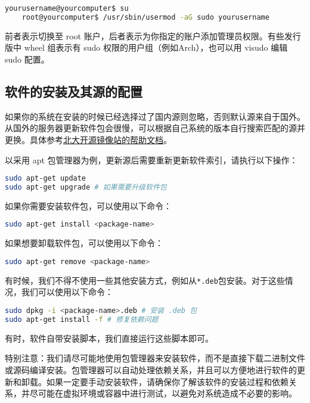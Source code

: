 \documentclass[../main.tex]{subfiles}
\begin{document}
\begin{lstlisting}[language=bash]
    yourusername@yourcomputer$ su
    root@yourcomputer$ /usr/sbin/usermod -aG sudo yourusername
\end{lstlisting}

前者表示切换至 root 账户，后者表示为你指定的账户添加管理员权限。有些发行版中 wheel 组表示有 sudo 权限的用户组（例如Arch），也可以用 visudo 编辑 sudo 配置。

\subsection{软件的安装及其源的配置}

如果你的系统在安装的时候已经选择过了国内源则忽略，否则默认源来自于国外。从国外的服务器更新软件包会很慢，可以根据自己系统的版本自行搜索匹配的源并更换。具体参考\href{https://mirrors.pku.edu.cn/Help}{北大开源镜像站的帮助文档}。

以采用 apt 包管理器为例，更新源后需要重新更新软件索引，请执行以下操作：

\begin{lstlisting}[language=bash]
sudo apt-get update
sudo apt-get upgrade # 如果需要升级软件包
\end{lstlisting}

如果你需要安装软件包，可以使用以下命令：
\begin{lstlisting}[language=bash]
sudo apt-get install <package-name>
\end{lstlisting}

如果想要卸载软件包，可以使用以下命令：
\begin{lstlisting}[language=bash]
sudo apt-get remove <package-name>
\end{lstlisting}

有时候，我们不得不使用一些其他安装方式，例如从\texttt{*.deb}包安装。对于这些情况，我们可以使用以下命令：

\begin{lstlisting}[language=bash]
sudo dpkg -i <package-name>.deb # 安装 .deb 包
sudo apt-get install -f # 修复依赖问题
\end{lstlisting}

有时，软件自带安装脚本，我们直接运行这些脚本即可。

特别注意：我们请尽可能地使用包管理器来安装软件，而不是直接下载二进制文件或源码编译安装。包管理器可以自动处理依赖关系，并且可以方便地进行软件的更新和卸载。如果一定要手动安装软件，请确保你了解该软件的安装过程和依赖关系，并尽可能在虚拟环境或容器中进行测试，以避免对系统造成不必要的影响。
\end{document}
